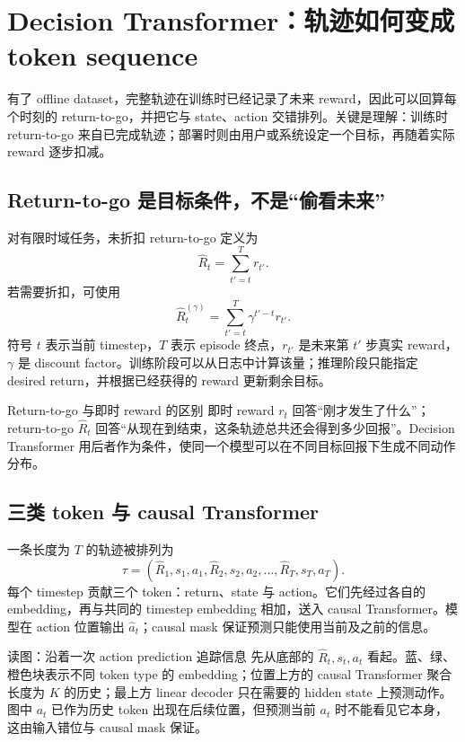 \section{Decision Transformer：轨迹如何变成 token sequence}

有了 offline dataset，完整轨迹在训练时已经记录了未来 reward，因此可以回算每个时刻的 return-to-go，并把它与 state、action 交错排列。关键是理解：训练时 return-to-go 来自已完成轨迹；部署时则由用户或系统设定一个目标，再随着实际 reward 逐步扣减。

\subsection{Return-to-go 是目标条件，不是“偷看未来”}

对有限时域任务，未折扣 return-to-go 定义为
\[
\widehat{R}_t=\sum_{t'=t}^{T}r_{t'}.
\]
若需要折扣，可使用
\[
\widehat{R}^{(\gamma)}_t=\sum_{t'=t}^{T}\gamma^{t'-t}r_{t'}.
\]
符号 $t$ 表示当前 timestep，$T$ 表示 episode 终点，$r_{t'}$ 是未来第 $t'$ 步真实 reward，$\gamma$ 是 discount factor。训练阶段可以从日志中计算该量；推理阶段只能指定 desired return，并根据已经获得的 reward 更新剩余目标。

\begin{importantbox}{Return-to-go 与即时 reward 的区别}
即时 reward $r_t$ 回答“刚才发生了什么”；return-to-go $\widehat{R}_t$ 回答“从现在到结束，这条轨迹总共还会得到多少回报”。Decision Transformer 用后者作为条件，使同一个模型可以在不同目标回报下生成不同动作分布。
\end{importantbox}

\subsection{三类 token 与 causal Transformer}

一条长度为 $T$ 的轨迹被排列为
\[
\tau=(\widehat{R}_1,s_1,a_1,\widehat{R}_2,s_2,a_2,\ldots,\widehat{R}_T,s_T,a_T).
\]
每个 timestep 贡献三个 token：return、state 与 action。它们先经过各自的 embedding，再与共同的 timestep embedding 相加，送入 causal Transformer。模型在 action 位置输出 $\widehat{a}_t$；causal mask 保证预测只能使用当前及之前的信息。


\begin{knowledgebox}{读图：沿着一次 action prediction 追踪信息}
先从底部的 $\widehat{R}_t,s_t,a_t$ 看起。蓝、绿、橙色块表示不同 token type 的 embedding；位置上方的 causal Transformer 聚合长度为 $K$ 的历史；最上方 linear decoder 只在需要的 hidden state 上预测动作。图中 $a_t$ 已作为历史 token 出现在后续位置，但预测当前 $a_t$ 时不能看见它本身，这由输入错位与 causal mask 保证。
\end{knowledgebox}

